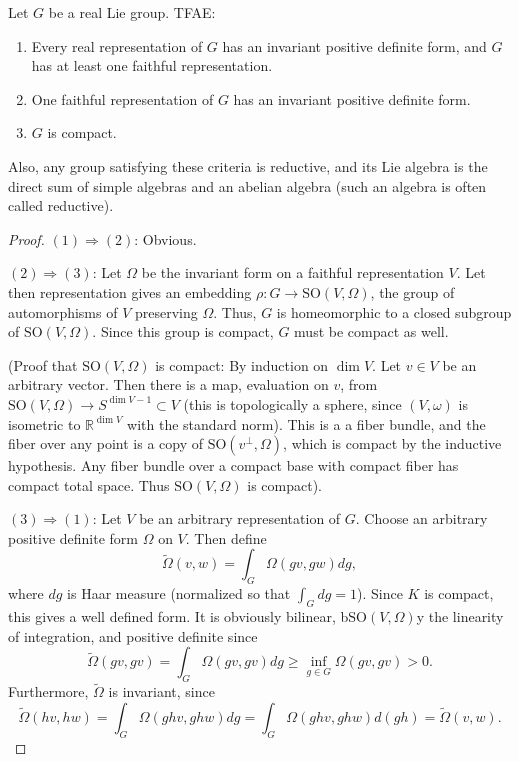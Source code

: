 \documentclass[12pt]{article}
\newcommand{\R}{\mathbb{R}}
\begin{document}
Let $G$ be a real Lie group.  TFAE:

\begin{enumerate}
\item Every real representation of $G$ has an invariant positive definite form, and $G$ has at least one faithful representation.
\item One faithful representation of $G$ has an invariant positive definite form.
\item $G$ is compact.
\end{enumerate}

Also, any group satisfying these criteria is reductive, and its Lie algebra is the direct sum of simple algebras and an abelian algebra (such an algebra is often called reductive).

\begin{proof}
$(1)\Rightarrow (2)$: Obvious.

$(2)\Rightarrow (3)$: Let $\Omega$ be the invariant form on a faithful representation $V$.  Let then representation gives an embedding 
$\rho:G\to \mathrm{SO}(V,\Omega)$, the group of automorphisms of $V$ preserving $\Omega$.  Thus, $G$ is homeomorphic to a closed subgroup of $\mathrm{SO}(V,\Omega)$.  Since this group is compact, $G$ must be compact as well.

(Proof that $\mathrm{SO}(V,\Omega)$ is compact: By induction on $\dim V$.  Let $v\in V$ be an arbitrary vector.  Then there is a map, evaluation on $v$, from
$\mathrm{SO}(V,\Omega)\to S^{\dim V-1}\subset V$ (this is topologically a sphere, since $(V,\omega)$ is isometric to $\R^{\dim V}$ with the standard norm).  This is a a fiber bundle, and the fiber over any point is a copy of $\mathrm{SO}(v^{\perp},\Omega)$, which is compact by the inductive hypothesis.  Any fiber bundle over a compact base with compact fiber has compact total space.  Thus $\mathrm{SO}(V,\Omega)$ is compact).

$(3)\Rightarrow(1)$: Let $V$ be an arbitrary representation of $G$.  Choose an arbitrary positive definite form $\Omega$ on $V$.
Then define $$\tilde{\Omega}(v,w)=\int_{G}\Omega(gv,gw)dg,$$
where $dg$ is Haar measure (normalized so that $\int_Gdg=1$).  Since $K$ is compact, this gives a well defined form.  It is obviously bilinear, b$\mathrm{SO}(V,\Omega)$y the linearity of integration, and positive definite since $$\tilde{\Omega}(gv,gv)=
\int_G\Omega(gv,gv)dg\geq \inf_{g\in G}\Omega(gv,gv)>0.$$  Furthermore, $\tilde\Omega$ is invariant, since $$\tilde\Omega(hv,hw)=\int_G\Omega(ghv,ghw)dg=\int_G\Omega(ghv,ghw)d(gh)=
\tilde\Omega(v,w).$$


\end{proof}
\end{document}
